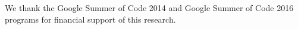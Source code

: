 \documentclass{iosart2x}
\theoremstyle{definition}
\begin{document}



\sloppy  %

\setcounter{footnote}{0}
\newcommand{\la}{\leftarrow}



%






\begin{acks}
We thank the Google Summer of Code 2014 and Google Summer of Code 2016 programs for financial support of this research. 
\end{acks}

\begin{footnotesize}
%


\end{footnotesize}
%
\end{document}
